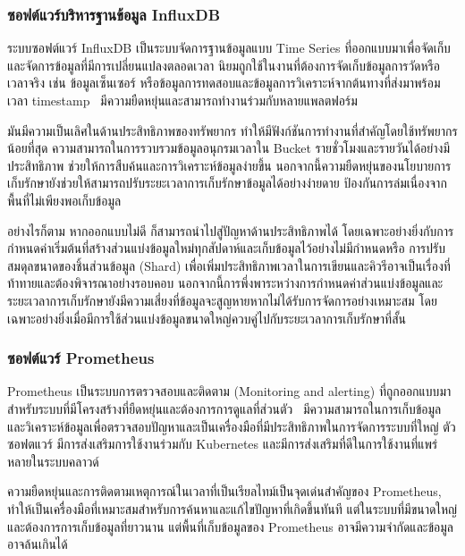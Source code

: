 \documentclass[12pt,one side,openright,a4paper]{cpe-thesis-th}
\newcommand{\thaijustify}[1]{%
  \par\hspace{30pt}\justifying
  #1
}
\begin{document}
\subsubsection{ซอฟต์แวร์บริหารฐานข้อมูล InfluxDB}
\thaijustify{
  ระบบซอฟต์แวร์ InfluxDB เป็นระบบจัดการฐานข้อมูลแบบ Time Series ที่ออกแบบมาเพื่อจัดเก็บและจัดการข้อมูลที่มีการเปลี่ยนแปลงตลอดเวลา นิยมถูกใช้ในงานที่ต้องการจัดเก็บข้อมูลการวัดหรือเวลาจริง เช่น ข้อมูลเซ็นเซอร์ หรือข้อมูลการทดสอบและข้อมูลการวิเคราะห์จากต้นทางที่ส่งมาพร้อมเวลา timestamp~\cite{influxdb} มีความยืดหยุ่นและสามารถทำงานร่วมกับหลายแพลตฟอร์ม~\cite{influxdb-platforms}
}
\thaijustify{
  มันมีความเป็นเลิศในด้านประสิทธิภาพของทรัพยากร ทำให้มีฟังก์ชันการทำงานที่สำคัญโดยใช้ทรัพยากรน้อยที่สุด ความสามารถในการรวบรวมข้อมูลอนุกรมเวลาใน Bucket รายชั่วโมงและรายวันได้อย่างมีประสิทธิภาพ ช่วยให้การสืบค้นและการวิเคราะห์ข้อมูลง่ายขึ้น นอกจากนี้ความยืดหยุ่นของนโยบายการเก็บรักษายังช่วยให้สามารถปรับระยะเวลาการเก็บรักษาข้อมูลได้อย่างง่ายดาย ป้องกันการล่มเนื่องจากพื้นที่ไม่เพียงพอเก็บข้อมูล~\cite{sandholm17influx}
}
\thaijustify{
  อย่างไรก็ตาม หากออกแบบไม่ดี ก็สามารถนำไปสู่ปัญหาด้านประสิทธิภาพได้ โดยเฉพาะอย่างยิ่งกับการกำหนดค่าเริ่มต้นที่สร้างส่วนแบ่งข้อมูลใหม่ทุกสัปดาห์และเก็บข้อมูลไว้อย่างไม่มีกำหนดหรือ การปรับสมดุลขนาดของชิ้นส่วนข้อมูล (Shard) เพื่อเพิ่มประสิทธิภาพเวลาในการเขียนและคิวรีอาจเป็นเรื่องที่ท้าทายและต้องพิจารณาอย่างรอบคอบ นอกจากนี้การพึ่งพาระหว่างการกำหนดค่าส่วนแบ่งข้อมูลและระยะเวลาการเก็บรักษายังมีความเสี่ยงที่ข้อมูลจะสูญหายหากไม่ได้รับการจัดการอย่างเหมาะสม โดยเฉพาะอย่างยิ่งเมื่อมีการใช้ส่วนแบ่งข้อมูลขนาดใหญ่ควบคู่ไปกับระยะเวลาการเก็บรักษาที่สั้น~\cite{sandholm17influx}
}
\subsubsection{ซอฟต์แวร์ Prometheus}
\thaijustify{
  Prometheus เป็นระบบการตรวจสอบและติดตาม (Monitoring and alerting) ที่ถูกออกแบบมาสำหรับระบบที่มีโครงสร้างที่ยืดหยุ่นและต้องการการดูแลที่ส่วนตัว~\cite{prometheus} มีความสามารถในการเก็บข้อมูลและวิเคราะห์ข้อมูลเพื่อตรวจสอบปัญหาและเป็นเครื่องมือที่มีประสิทธิภาพในการจัดการระบบที่ใหญ่ ตัวซอฟตแวร์ มีการส่งเสริมการใช้งานร่วมกับ Kubernetes และมีการส่งเสริมที่ดีในการใช้งานที่แพร่หลายในระบบคลาวด์
}
\thaijustify{
  ความยืดหยุ่นและการติดตามเหตุการณ์ในเวลาที่เป็นเรียลไทม์เป็นจุดเด่นสำคัญของ Prometheus, ทำให้เป็นเครื่องมือที่เหมาะสมสำหรับการค้นหาและแก้ไขปัญหาที่เกิดขึ้นทันที แต่ในระบบที่มีขนาดใหญ่และต้องการการเก็บข้อมูลที่ยาวนาน แต่พื้นที่เก็บข้อมูลของ Prometheus อาจมีความจำกัดและข้อมูลอาจล้นเกินได้
}
\end{document}
